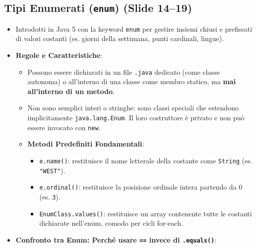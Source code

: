 \documentclass[11pt,a4paper,oneside]{report}
\newcommand{\passthrough}[1]{#1}
\providecommand{\tightlist}{\setlength{\itemsep}{0pt}\setlength{\parskip}{0pt}}
\begin{document}
\subsection{\texorpdfstring{Tipi Enumerati (\texttt{enum}) (Slide
14--19)}{Tipi Enumerati (enum) (Slide 14--19)}}\label{chap08_tipi-enumerati-enum-slide-1419}

\begin{itemize}
\tightlist
\item
  Introdotti in Java 5 con la keyword \passthrough{\lstinline!enum!} per
  gestire insiemi chiusi e prefissati di valori costanti (es. giorni
  della settimana, punti cardinali, lingue).
\item
  \textbf{Regole e Caratteristiche}:

  \begin{itemize}
  \tightlist
  \item
    Possono essere dichiarati in un file \passthrough{\lstinline!.java!}
    dedicato (come classe autonoma) o all'interno di una classe come
    membro statico, ma \textbf{mai all'interno di un metodo}.
  \item
    Non sono semplici interi o stringhe: sono classi speciali che
    estendono implicitamente \passthrough{\lstinline!java.lang.Enum!}.
    Il loro costruttore è privato e non può essere invocato con
    \passthrough{\lstinline!new!}.
  \item
    \textbf{Metodi Predefiniti Fondamentali}:

    \begin{itemize}
    \tightlist
    \item
      \passthrough{\lstinline!e.name()!}: restituisce il nome letterale
      della costante come \passthrough{\lstinline!String!} (es.
      \passthrough{\lstinline!"WEST"!}).
    \item
      \passthrough{\lstinline!e.ordinal()!}: restituisce la posizione
      ordinale intera partendo da 0 (es. \passthrough{\lstinline!3!}).
    \item
      \passthrough{\lstinline!EnumClass.values()!}: restituisce un array
      contenente tutte le costanti dichiarate nell'enum, comodo per
      cicli for-each.
    \end{itemize}
  \end{itemize}
\item
  \textbf{Confronto tra Enum: Perché usare \passthrough{\lstinline!==!}
  invece di \passthrough{\lstinline!.equals()!}}:


\end{itemize}
\end{document}

